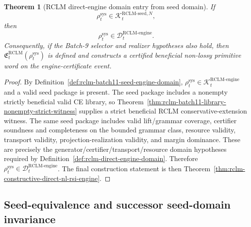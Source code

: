 \documentclass[11pt,a4paper]{article}
\newtheorem{theorem}{Theorem}[section]
\newcommand{\Kcal}{\mathcal K}
\newcommand{\Dcal}{\mathcal D}
\newcommand{\RCLM}{\mathrm{RCLM}}
\newcommand{\sys}{\mathrm{sys}}
\newcommand{\engine}{\mathrm{engine}}
\begin{document}
\begin{theorem}[RCLM direct-engine domain entry from seed domain]
\label{thm:rclm-batch11-domain-entry-from-seed}
If
\[
\rho_t^{\sys}\in\Kcal_t^{\RCLM\text{-}\mathrm{seed},N},
\]
then
\[
\rho_t^{\sys}\in\Dcal_t^{\RCLM\text{-}\engine}.
\]
Consequently, if the Batch-9 selector and realizer hypotheses also hold, then \(\mathfrak E_t^{\RCLM}(\rho_t^{\sys})\) is defined and constructs a certified beneficial non-lossy primitive word on the engine-certificate event.
\end{theorem}

\begin{proof}
By Definition~\ref{def:rclm-batch11-seed-engine-domain}, \(\rho_t^{\sys}\in\Kcal_t^{\RCLM\text{-}\engine}\) and a valid seed package is present.  The seed package includes a nonempty strictly beneficial valid CE library, so Theorem~\ref{thm:rclm-batch11-library-nonempty-strict-witness} supplies a strict beneficial RCLM conservative-extension witness.  The same seed package includes valid lift/grammar coverage, certifier soundness and completeness on the bounded grammar class, resource validity, transport validity, projection-realization validity, and margin dominance.  These are precisely the generator/certifier/transport/resource domain hypotheses required by Definition~\ref{def:rclm-direct-engine-domain}.  Therefore \(\rho_t^{\sys}\in\Dcal_t^{\RCLM\text{-}\engine}\).  The final construction statement is then Theorem~\ref{thm:rclm-constructive-direct-nl-rsi-engine}.
\end{proof}

\subsection{Seed-equivalence and successor seed-domain invariance}
\end{document}
